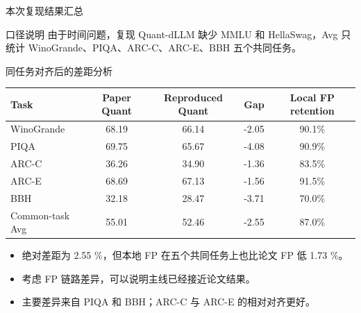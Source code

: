 \documentclass[aspectratio=169,11pt]{ctexbeamer}
\begin{document}
\begin{frame}{本次复现结果汇总}
  \scriptsize
  \centering

  \vspace{0.25cm}
  \begin{block}{口径说明}
    \small
    由于时间问题，复现 Quant-dLLM 缺少 MMLU 和 HellaSwag，Avg 只统计 WinoGrande、PIQA、ARC-C、ARC-E、BBH 五个共同任务。
  \end{block}
\end{frame}

\begin{frame}{同任务对齐后的差距分析}
  \scriptsize
  \centering
  \begin{tabular}{l c c c c}
    \toprule
    Task & Paper Quant & Reproduced Quant & Gap & Local FP retention \\
    \midrule
    WinoGrande & 68.19 & 66.14 & -2.05 & 90.1\% \\
    PIQA & 69.75 & 65.67 & -4.08 & 90.9\% \\
    ARC-C & 36.26 & 34.90 & -1.36 & 83.5\% \\
    ARC-E & 68.69 & 67.13 & -1.56 & 91.5\% \\
    BBH & 32.18 & 28.47 & -3.71 & 70.0\% \\
    \midrule
    Common-task Avg & 55.01 & 52.46 & -2.55 & 87.0\% \\
    \bottomrule
  \end{tabular}

  \vspace{0.35cm}
  \begin{itemize}
    \item 绝对差距为 2.55 \%，但本地 FP 在五个共同任务上也比论文 FP 低 1.73 \%。
    \item 考虑 FP 链路差异，可以说明主线已经接近论文结果。
    \item 主要差异来自 PIQA 和 BBH；ARC-C 与 ARC-E 的相对对齐更好。
  \end{itemize}
\end{frame}
\end{document}
